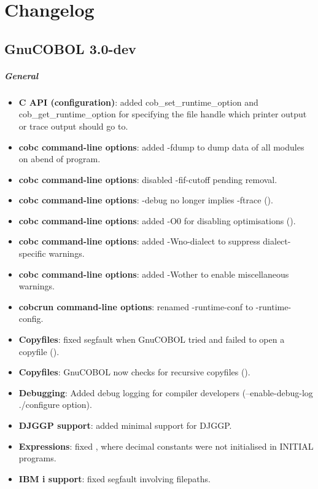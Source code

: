 \chapter{Changelog}

\section{GnuCOBOL 3.0-dev}

\paragraph{General}
\begin{itemize}
\item \textbf{C API (configuration)}: added cob\_set\_runtime\_option and cob\_get\_runtime\_option for specifying the file handle which printer output or trace output should go to.
\item \textbf{cobc command-line options}: added -fdump to dump data of all modules on abend of program.
\item \textbf{cobc command-line options}: disabled -fif-cutoff pending removal.
\item \textbf{cobc command-line options}: -debug no longer implies -ftrace ().
\item \textbf{cobc command-line options}: added -O0 for disabling optimisations ().
\item \textbf{cobc command-line options}: added -Wno-dialect to suppress dialect-specific warnings.
\item \textbf{cobc command-line options}: added -Wother to enable miscellaneous warnings.
\item \textbf{cobcrun command-line options}: renamed -runtime-conf to -runtime-config.
\item \textbf{Copyfiles}: fixed segfault when GnuCOBOL tried and failed to open a copyfile ().
\item \textbf{Copyfiles}: GnuCOBOL now checks for recursive copyfiles ().
\item \textbf{Debugging}: Added debug logging for compiler developers (--enable-debug-log ./configure option).
\item \textbf{DJGGP support}: added minimal support for DJGGP.
\item \textbf{Expressions}: fixed , where decimal constants were not initialised in INITIAL programs.
\item \textbf{IBM i support}: fixed segfault involving filepaths.

\end{itemize}
